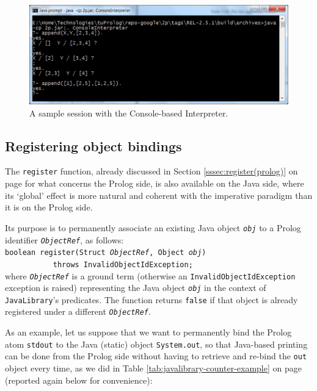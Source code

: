 \begin{figure}
  \centering
  \includegraphics[width=12cm]{images/console-interpreter}
  \caption{A sample session with the Console-based Interpreter.}
  \label{fig:console-interpreter}
\end{figure}

\subsection{Registering object bindings}
\label{ssec:register(Java)}

The \texttt{register} function, already discussed in Section \ref{sssec:register(prolog)} on page \pageref{sssec:register(prolog)} for what concerns the Prolog side, is also available on the Java side, where its `global' effect is more natural and coherent with the imperative paradigm than it is on the Prolog side.

Its purpose is to permanently associate an existing Java object \texttt{\textit{obj}} to a Prolog identifier \texttt{\textit{ObjectRef}}, as follows:\\

\texttt{boolean register(Struct \textit{ObjectRef}, Object \textit{obj})\\
    \mbox{~~~~~~~~~~~}throws InvalidObjectIdException;}\\

\noindent where \texttt{\textit{ObjectRef}} is a ground term (otherwise an \texttt{InvalidObjectIdException} exception is raised) representing the Java object
\texttt{\textit{obj}} in the context of \texttt{JavaLibrary}'s predicates.
The function returns \texttt{false} if that object is already registered under a different \texttt{\textit{ObjectRef}}.

As an example, let us suppose that we want to permanently bind the Prolog atom \texttt{stdout} to the Java (static) object \texttt{System.out}, so that Java-based printing can be done from the Prolog side without having to retrieve and re-bind the \texttt{out} object every time, as we did in Table \ref{tab:javalibrary-counter-example} on page \pageref{tab:javalibrary-counter-example} (reported again below for convenience):

